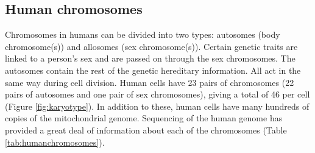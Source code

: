 \hypertarget{human-chromosomes}{%
\subsection{Human chromosomes}\label{human-chromosomes}}

Chromosomes in humans can be divided into two types: autosomes (body chromosome(s)) and allosomes (sex chromosome(s)). Certain genetic traits are linked to a person's sex and are passed on through the sex chromosomes. The autosomes contain the rest of the genetic hereditary information. All act in the same way during cell division. Human cells have 23 pairs of chromosomes (22 pairs of autosomes and one pair of sex chromosomes), giving a total of 46 per cell (Figure \ref{fig:karyotype}). In addition to these, human cells have many hundreds of copies of the mitochondrial genome. Sequencing of the human genome has provided a great deal of information about each of the chromosomes (Table \ref{tab:humanchromosomes}).

